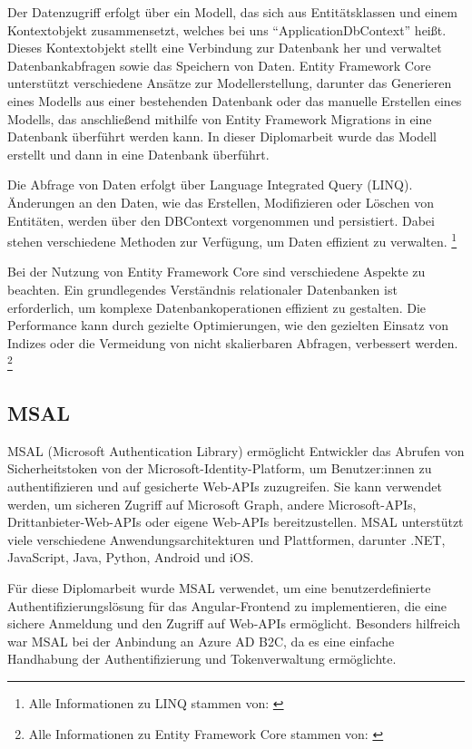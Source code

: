 Der Datenzugriff erfolgt über ein Modell, das sich aus Entitätsklassen und einem 
Kontextobjekt zusammensetzt, welches bei uns ``ApplicationDbContext'' heißt. Dieses Kontextobjekt 
stellt eine Verbindung zur Datenbank her und verwaltet Datenbankabfragen sowie das Speichern 
von Daten. Entity Framework Core unterstützt verschiedene Ansätze zur Modellerstellung, 
darunter das Generieren eines Modells aus einer bestehenden Datenbank oder das manuelle 
Erstellen eines Modells, das anschließend mithilfe von Entity Framework Migrations in 
eine Datenbank überführt werden kann. In dieser Diplomarbeit wurde das Modell erstellt und dann
in eine Datenbank überführt.

Die Abfrage von Daten erfolgt über Language Integrated Query (LINQ). Änderungen an den Daten, 
wie das Erstellen, Modifizieren oder Löschen von Entitäten, werden über den DBContext 
vorgenommen und persistiert. Dabei stehen verschiedene Methoden zur Verfügung, 
um Daten effizient zu verwalten.
\footnote{Alle Informationen zu LINQ stammen von: \cite{MicrosoftCorporationq}}

Bei der Nutzung von Entity Framework Core sind verschiedene Aspekte zu beachten. Ein 
grundlegendes Verständnis relationaler Datenbanken ist erforderlich, um komplexe 
Datenbankoperationen effizient zu gestalten. Die Performance kann durch gezielte 
Optimierungen, wie den gezielten Einsatz von Indizes oder die Vermeidung von nicht 
skalierbaren Abfragen, verbessert werden.
\footnote{Alle Informationen zu Entity Framework Core stammen von: \cite{MicrosoftCorporationp}}


\subsection{MSAL}

MSAL (Microsoft Authentication Library) ermöglicht Entwickler das Abrufen von Sicherheitstoken 
von der Microsoft-Identity-Platform, um Benutzer:innen zu authentifizieren und auf gesicherte Web-APIs 
zuzugreifen. Sie kann verwendet werden, um sicheren Zugriff auf Microsoft Graph, andere 
Microsoft-APIs, Drittanbieter-Web-APIs oder eigene Web-APIs bereitzustellen. MSAL unterstützt 
viele verschiedene Anwendungsarchitekturen und Plattformen, darunter .NET, JavaScript, Java, 
Python, Android und iOS.

Für diese Diplomarbeit wurde MSAL verwendet, um eine benutzerdefinierte Authentifizierungslösung 
für das Angular-Frontend zu implementieren, die eine sichere Anmeldung und den Zugriff auf 
Web-APIs ermöglicht. Besonders hilfreich war MSAL bei der Anbindung an Azure AD B2C, da es 
eine einfache Handhabung der Authentifizierung und Tokenverwaltung ermöglichte.

